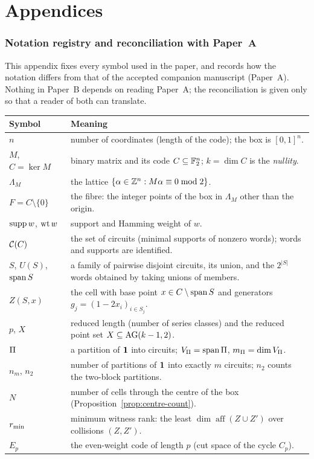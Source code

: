 \part*{Appendices}

\section{Notation registry and reconciliation with Paper~A}\label{app:notation}

This appendix fixes every symbol used in the paper, and records how the notation differs from that of the accepted companion manuscript (Paper~A). Nothing in Paper~B depends on reading Paper~A; the reconciliation is given only so that a reader of both can translate.

\begin{center}\small
\begin{tabular}{@{}p{3.1cm}p{11.4cm}@{}}
\toprule
Symbol & Meaning\\\midrule
$n$ & number of coordinates (length of the code); the box is $[0,1]^n$.\\
$M$, $C=\ker M$ & binary matrix and its code $C\subseteq\mathbb F_2^n$; $k=\dim C$ is the \emph{nullity}.\\
$\Lambda_M$ & the lattice $\{\alpha\in\mathbb Z^n: M\alpha\equiv0\bmod2\}$.\\
$F=C\setminus\{0\}$ & the fibre: the integer points of the box in $\Lambda_M$ other than the origin.\\
$\operatorname{supp} w$, $\operatorname{wt} w$ & support and Hamming weight of $w$.\\
$\mathcal C(C)$ & the set of circuits (minimal supports of nonzero words); words and supports are identified.\\
$S$, $U(S)$, $\operatorname{span} S$ & a family of pairwise disjoint circuits, its union, and the $2^{|S|}$ words obtained by taking unions of members.\\
$Z(S,x)$ & the cell with base point $x\in C\setminus\operatorname{span} S$ and generators $g_j=(1-2x_i)_{i\in S_j}$.\\
$p$, $X$ & reduced length (number of series classes) and the reduced point set $X\subseteq\mathrm{AG}(k-1,2)$.\\
$\Pi$ & a partition of $\mathbf 1$ into circuits; $V_\Pi=\operatorname{span}\Pi$, $m_\Pi=\dim V_\Pi$.\\
$n_m$, $n_2$ & number of partitions of $\mathbf 1$ into exactly $m$ circuits; $n_2$ counts the two-block partitions.\\
$N$ & number of cells through the centre of the box (Proposition~\ref{prop:centre-count}).\\
$r_{\min}$ & minimum witness rank: the least $\dim\operatorname{aff}(Z\cup Z')$ over collisions $(Z,Z')$.\\
$E_p$ & the even-weight code of length $p$ (cut space of the cycle $C_p$).\\\bottomrule
\end{tabular}
\end{center}

